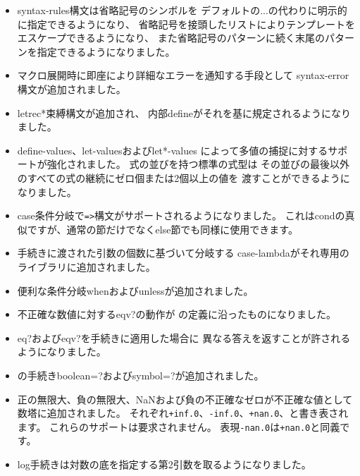 \begin{itemize}
\item {\cf syntax-rules}構文は省略記号のシンボルを
デフォルトの{\cf ...}の代わりに明示的に指定できるようになり、
省略記号を接頭したリストによりテンプレートをエスケープできるようになり、
また省略記号のパターンに続く末尾のパターンを指定できるようになりました。

\item マクロ展開時に即座により詳細なエラーを通知する手段として
{\cf syntax-error}構文が追加されました。

\item {\cf letrec*}束縛構文が追加され、
内部{\cf define}がそれを基に規定されるようになりました。

\item {\cf define-values}、{\cf let-values}および{\cf let*-values}
によって多値の捕捉に対するサポートが強化されました。
式の並びを持つ標準の式型は
その並びの最後以外のすべての式の継続にゼロ個または2個以上の値を
渡すことができるようになりました。

\item {\cf case}条件分岐で{\tt =>}構文がサポートされるようになりました。
これは{\cf cond}の真似ですが、通常の節だけでなく{\cf else}節でも同様に使用できます。

\item 手続きに渡された引数の個数に基づいて分岐する
{\cf case-lambda}がそれ専用のライブラリに追加されました。

\item 便利な条件分岐{\cf when}および{\cf unless}が追加されました。

\item 不正確な数値に対する{\cf eqv?}の動作が
\rsixrs{}の定義に沿ったものになりました。

\item {\cf eq?}および{\cf eqv?}を手続きに適用した場合に
異なる答えを返すことが許されるようになりました。

\item \rsixrs{}の手続き{\cf boolean=?}および{\cf symbol=?}が追加されました。

\item 正の無限大、負の無限大、NaNおよび負の不正確なゼロが不正確な値として数塔に追加されました。
それぞれ{\tt +inf.0}、{\tt -inf.0}、{\tt +nan.0}、{}と書き表されます。
これらのサポートは要求されません。
表現{\tt -nan.0}は{\tt +nan.0}と同義です。

\item {\cf log}手続きは対数の底を指定する第2引数を取るようになりました。


\end{itemize}

